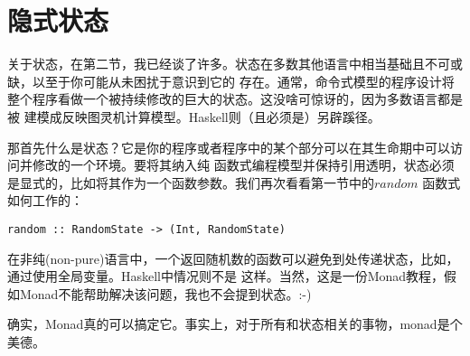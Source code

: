 \section{隐式状态}
关于状态，在第二节，我已经谈了许多。状态在多数其他语言中相当基础且不可或缺，以至于你可能从未困扰于意识到它的
存在。通常，命令式模型的程序设计将整个程序看做一个被持续修改的巨大的状态。这没啥可惊讶的，因为多数语言都是被
建模成反映图灵机计算模型。Haskell则（且必须是）另辟蹊径。

那首先什么是状态？它是你的程序或者程序中的某个部分可以在其生命期中可以访问并修改的一个环境。要将其纳入纯
函数式编程模型并保持引用透明，状态必须是显式的，比如将其作为一个函数参数。我们再次看看第一节中的$random$
函数式如何工作的：

\begin{lstlisting}
random :: RandomState -> (Int, RandomState)
\end{lstlisting}

在非纯(non-pure)语言中，一个返回随机数的函数可以避免到处传递状态，比如，通过使用全局变量。Haskell中情况则不是
这样。当然，这是一份Monad教程，假如Monad不能帮助解决该问题，我也不会提到状态。:-)

确实，Monad真的可以搞定它。事实上，对于所有和状态相关的事物，monad是个美德。